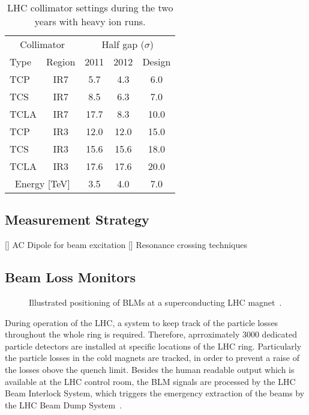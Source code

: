 \begin{table}[htbp]
\caption{LHC collimator settings during the two years with heavy ion runs.}
\begin{center}
\begin{tabular}{lcccc}
\toprule
\midrule
 \multicolumn{2}{c}{Collimator} & \multicolumn{3}{c}{Half gap ($\sigma$)} \\
Type & Region & 2011 & 2012 & Design \\ \midrule
TCP & IR7 & 5.7 & 4.3 & 6.0 \\
TCS & IR7 & 8.5 & 6.3 & 7.0 \\
TCLA & IR7 & 17.7 & 8.3 & 10.0 \\
TCP & IR3 & 12.0 & 12.0 & 15.0 \\
TCS & IR3 & 15.6 & 15.6 & 18.0 \\
TCLA & IR3 & 17.6 & 17.6 & 20.0 \\ \midrule
 \multicolumn{2}{c}{Energy [TeV]} & 3.5 & 4.0 & 7.0 \\
\bottomrule
\end{tabular}
\end{center}
\label{tab:14070901}
\end{table}


\subsection{Measurement Strategy}
[] AC Dipole for beam excitation
[] Resonance crossing techniques

\subsection{Beam Loss Monitors}

\begin{figure}[b]
  \centering
   \def\svgwidth{1.0\linewidth}
   
  \caption{Illustrated positioning of BLMs at a superconducting LHC magnet~\cite{dehning2002lhc}.}
\label{pic:14061701}
\end{figure}

During operation of the LHC, a system to keep track of the particle losses throughout the whole ring is required. Therefore, aprroximately 3000 dedicated particle detectors are installed at specific locations of the LHC ring. Particularly the particle losses in the cold magnets are tracked, in order to prevent a raise of the losses obove the quench limit. Besides the human readable output which is available at the LHC control room, the BLM signals are processed by the LHC Beam Interlock System, which triggers the emergency extraction of the beams by the LHC Beam Dump System~\cite{guaglio2005reliability}.

